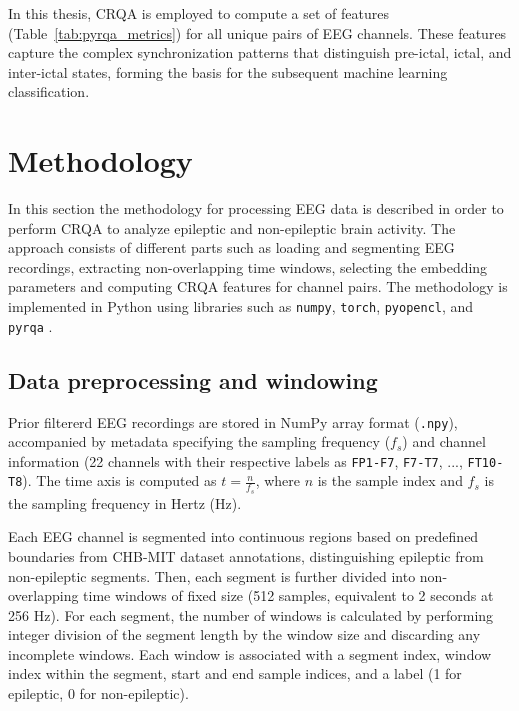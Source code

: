 \documentclass{article}
\begin{document}
					In this thesis, CRQA is employed to compute a set of features (Table~\ref{tab:pyrqa_metrics}) for all unique pairs of EEG channels. These features capture the complex synchronization patterns that distinguish pre-ictal, ictal, and inter-ictal states, forming the basis for the subsequent machine learning classification.





	\newpage

					
				\section{Methodology}
				\label{sec:methodology}

				In this section the methodology for processing EEG data is described in order to perform CRQA to analyze epileptic and non-epileptic brain activity. 
				The approach consists of different parts such as loading and segmenting EEG recordings, 
				extracting non-overlapping time windows, selecting the embedding parameters and computing CRQA features for channel pairs. 
				The methodology is implemented in Python using libraries such as \texttt{numpy}, \texttt{torch}, \texttt{pyopencl}, and \texttt{pyrqa} \cite{pyrqacitation}.

				\subsection{Data preprocessing and windowing}
				\label{subsec:data_preprocessing}

				Prior filtererd EEG recordings are stored in NumPy array format (\texttt{.npy}), 
				accompanied by metadata specifying the sampling frequency (\(f_s\)) and channel information 
				(22 channels with their respective labels as \texttt{FP1-F7}, \texttt{F7-T7}, ..., \texttt{FT10-T8}). 
				The time axis is computed as \(t = \frac{n}{f_s}\), where \(n\) is the sample index and \(f_s\) is the sampling frequency in Hertz (Hz).

				Each EEG channel is segmented into continuous regions based on predefined boundaries from CHB-MIT dataset \cite{chbmitDataset} annotations, distinguishing epileptic from non-epileptic segments. 
				Then, each segment is further divided into non-overlapping time windows of fixed size (512 samples, equivalent to 2 seconds at 256 Hz). 
				For each segment, the number of windows is calculated by performing integer division of the segment length by the window size and discarding any incomplete windows. 
				Each window is associated with a segment index, window index within the segment, start and end sample indices, and a label (1 for epileptic, 0 for non-epileptic).
\end{document}
